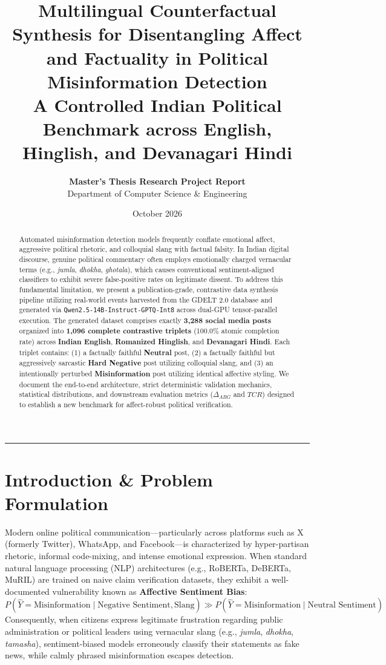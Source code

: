\documentclass[11pt,a4paper]{article}
\title{\textbf{\Large Multilingual Counterfactual Synthesis for Disentangling Affect and Factuality in Political Misinformation Detection}\\[0.5ex]
\large A Controlled Indian Political Benchmark across English, Hinglish, and Devanagari Hindi}
\author{\textbf{Master's Thesis Research Project Report} \\ Department of Computer Science \& Engineering}
\date{October 2026}
\begin{document}
\maketitle

\begin{abstract}
Automated misinformation detection models frequently conflate emotional affect, aggressive political rhetoric, and colloquial slang with factual falsity. In Indian digital discourse, genuine political commentary often employs emotionally charged vernacular terms (e.g., \textit{jumla}, \textit{dhokha}, \textit{ghotala}), which causes conventional sentiment-aligned classifiers to exhibit severe false-positive rates on legitimate dissent. To address this fundamental limitation, we present a publication-grade, contrastive data synthesis pipeline utilizing real-world events harvested from the GDELT 2.0 database and generated via \texttt{Qwen2.5-14B-Instruct-GPTQ-Int8} across dual-GPU tensor-parallel execution. The generated dataset comprises exactly \textbf{3,288 social media posts} organized into \textbf{1,096 complete contrastive triplets} (100.0\% atomic completion rate) across \textbf{Indian English}, \textbf{Romanized Hinglish}, and \textbf{Devanagari Hindi}. Each triplet contains: (1) a factually faithful \textbf{Neutral} post, (2) a factually faithful but aggressively sarcastic \textbf{Hard Negative} post utilizing colloquial slang, and (3) an intentionally perturbed \textbf{Misinformation} post utilizing identical affective styling. We document the end-to-end architecture, strict deterministic validation mechanics, statistical distributions, and downstream evaluation metrics ($\Delta_{ABG}$ and $TCR$) designed to establish a new benchmark for affect-robust political verification.
\end{abstract}

\vspace{1em}
\hrule
\vspace{1.5em}

\section{Introduction \& Problem Formulation}
Modern online political communication—particularly across platforms such as X (formerly Twitter), WhatsApp, and Facebook—is characterized by hyper-partisan rhetoric, informal code-mixing, and intense emotional expression. When standard natural language processing (NLP) architectures (e.g., RoBERTa, DeBERTa, MuRIL) are trained on naive claim verification datasets, they exhibit a well-documented vulnerability known as \textbf{Affective Sentiment Bias}:
\begin{equation}
P(\hat{Y} = \text{Misinformation} \mid \text{Negative Sentiment}, \text{Slang}) \gg P(\hat{Y} = \text{Misinformation} \mid \text{Neutral Sentiment})
\end{equation}
Consequently, when citizens express legitimate frustration regarding public administration or political leaders using vernacular slang (e.g., \textit{jumla}, \textit{dhokha}, \textit{tamasha}), sentiment-biased models erroneously classify their statements as fake news, while calmly phrased misinformation escapes detection.
\end{document}

